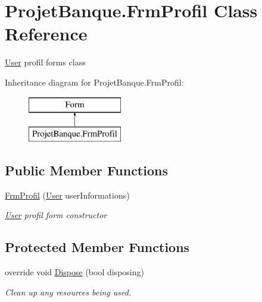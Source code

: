 \hypertarget{class_projet_banque_1_1_frm_profil}{}\section{Projet\+Banque.\+Frm\+Profil Class Reference}
\label{class_projet_banque_1_1_frm_profil}


\mbox{\hyperlink{class_projet_banque_1_1_user}{User}} profil form\textquotesingle{}s class  


Inheritance diagram for Projet\+Banque.\+Frm\+Profil\+:\begin{figure}[H]
\begin{center}
\leavevmode
\includegraphics[height=2.000000cm]{class_projet_banque_1_1_frm_profil}
\end{center}
\end{figure}
\subsection*{Public Member Functions}
\begin{DoxyCompactItemize}
\item 
\mbox{\hyperlink{class_projet_banque_1_1_frm_profil_ae572db7d815775f63882e2988fd4a52a}{Frm\+Profil}} (\mbox{\hyperlink{class_projet_banque_1_1_user}{User}} user\+Informations)
\begin{DoxyCompactList}\small\item\em \mbox{\hyperlink{class_projet_banque_1_1_user}{User}} profil form constructor \end{DoxyCompactList}\end{DoxyCompactItemize}
\subsection*{Protected Member Functions}
\begin{DoxyCompactItemize}
\item 
override void \mbox{\hyperlink{class_projet_banque_1_1_frm_profil_ae51ee9c4382f5e7bc5510b3d5d924a57}{Dispose}} (bool disposing)
\begin{DoxyCompactList}\small\item\em Clean up any resources being used. \end{DoxyCompactList}\end{DoxyCompactItemize}


